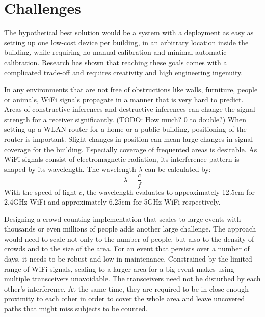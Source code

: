 \documentclass[conference]{IEEEtran}
\begin{document}
\section{Challenges}
The hypothetical best solution would be a system with a deployment as easy as setting up one low-cost device per building, in an arbitrary location inside the building, while requiring no manual calibration and minimal automatic calibration. Research has shown that reaching these goals comes with a complicated trade-off and requires creativity and high engineering ingenuity. 
\par
In any environments that are not free of obstructions like walls, furniture, people or animals, WiFi signals propagate in a manner that is very hard to predict. Areas of constructive inferences and destructive inferences can change the signal strength for a receiver significantly. (TODO: How much? 0 to double?) When setting up a WLAN router for a home or a public building, positioning of the router is important. Slight changes in position can mean large changes in signal coverage for the building. Especially coverage of frequented areas is desirable. As WiFi signals consist of electromagnetic radiation, its interference pattern is shaped by its wavelength. The wavelength $\lambda$ can be calculated by: $$\lambda = \frac{c}{f}$$ With the speed of light $c$, the wavelength evaluates to approximately 12.5cm for 2,4GHz WiFi and approximately 6.25cm for 5GHz WiFi respectively.
\par
Designing a crowd counting implementation that scales to large events with thousands or even millions of people adds another large challenge. The approach would need to scale not only to the number of people, but also to the density of crowds and to the size of the area. For an event that persists over a number of days, it needs to be robust and low in maintenance. Constrained by the limited range of WiFi signals, scaling to a larger area for a big event makes using multiple transceivers unavoidable. The transceivers need not be disturbed by each other's interference. At the same time, they are required to be in close enough proximity to each other in order to cover the whole area and leave uncovered paths that might miss subjects to be counted.
\end{document}
